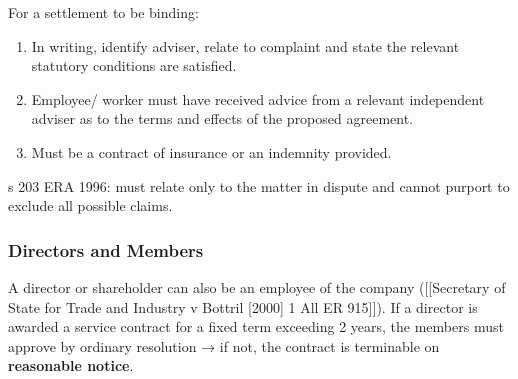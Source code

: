 \documentclass[
]{article}
\providecommand{\tightlist}{%
  \setlength{\itemsep}{0pt}\setlength{\parskip}{0pt}}
\begin{document}
For a settlement to be binding:

\begin{enumerate}
\def\labelenumi{\arabic{enumi}.}
\tightlist
\item
  In writing, identify adviser, relate to complaint and state the
  relevant statutory conditions are satisfied.
\item
  Employee/ worker must have received advice from a relevant independent
  adviser as to the terms and effects of the proposed agreement.
\item
  Must be a contract of insurance or an indemnity provided.
\end{enumerate}

s 203 ERA 1996: must relate only to the matter in dispute and cannot
purport to exclude all possible claims.

\hypertarget{directors-and-members}{%
\subsubsection{Directors and Members}\label{directors-and-members}}

A director or shareholder can also be an employee of the company
({[}{[}Secretary of State for Trade and Industry v Bottril {[}2000{]} 1
All ER 915{]}{]}). If a director is awarded a service contract for a
fixed term exceeding 2 years, the members must approve by ordinary
resolution → if not, the contract is terminable on \textbf{reasonable
notice}.
\end{document}
